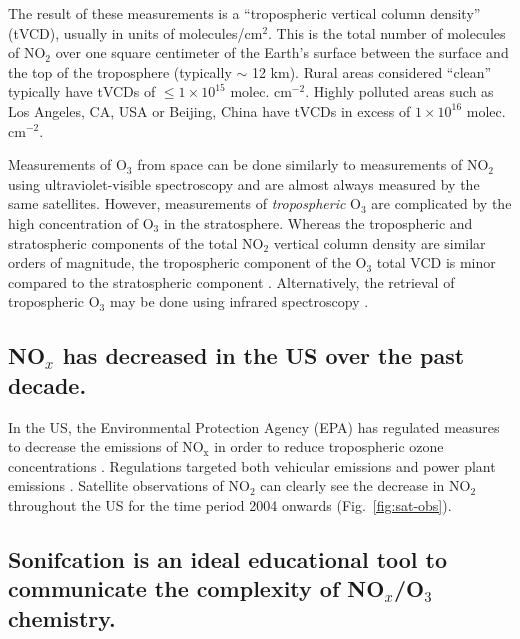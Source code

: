 \documentclass[a4paper,10pt,oneside]{article}
\newcommand{\ce}[1]{$\mathrm{#1}$}
\begin{document}
\begin{sloppy}
The result of these measurements is a ``tropospheric vertical column density'' (tVCD), usually in units of molecules/cm$^2$. This is the total number of molecules of \ce{NO_2} over one square centimeter of the Earth's surface between the surface and the top of the troposphere (typically $\sim$ 12 km). Rural areas considered ``clean'' typically have tVCDs of $\leq 1 \times 10^{15}$ molec. cm$^{-2}$. Highly polluted areas such as Los Angeles, CA, USA or Beijing, China have tVCDs in excess of $1 \times 10^{16}$ molec. cm$^{-2}$.

Measurements of \ce{O_3} from space can be done similarly to measurements of \ce{NO_2} using ultraviolet-visible spectroscopy and are almost always measured by the same satellites. However, measurements of \emph{tropospheric} \ce{O_3} are complicated by the high concentration of \ce{O_3} in the stratosphere. Whereas the tropospheric and stratospheric components of the total \ce{NO_2} vertical column density are similar orders of magnitude, the tropospheric component of the \ce{O_3} total VCD is minor compared to the stratospheric component \cite{monks-beirle}. Alternatively, the retrieval of tropospheric \ce{O_3} may be done using infrared spectroscopy \cite{nassar08}.

\subsection{NO$_x$ has decreased in the US over the past decade.}
\label{sec:nox-decrease}

In the US, the Environmental Protection Agency (EPA) has regulated measures to decrease the emissions of \ce{NO_x} in order to reduce tropospheric ozone concentrations \cite{epa99}. Regulations targeted both vehicular emissions \cite{epa16} and power plant emissions \cite{epa-cair}.  Satellite observations of \ce{NO_2} \cite{russell12, kim09, lu15} can clearly see the decrease in \ce{NO_2} throughout the US for the time period 2004 onwards (Fig.~\ref{fig:sat-obs}).

\subsection{Sonifcation is an ideal educational tool to communicate the complexity of NO$_x$/O$_3$ chemistry.}


\end{sloppy}
\end{document}
